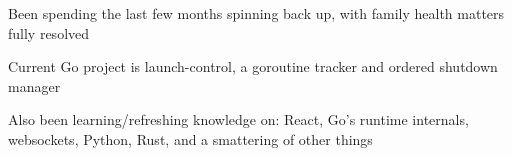 \item Been spending the last few months spinning back up, with family health matters fully resolved
\item Current Go project is launch-control, a goroutine tracker and ordered shutdown manager
\item Also been learning/refreshing knowledge on: React, Go's runtime internals, websockets,
      Python, Rust, and a smattering of other things


